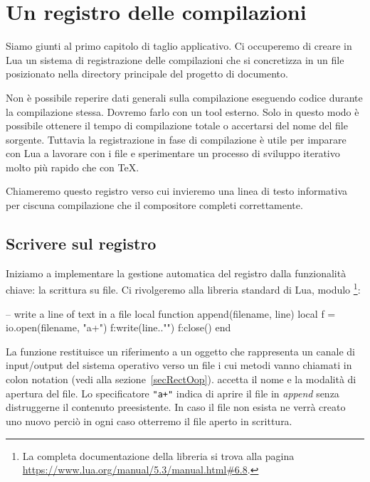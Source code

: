 

\chapter{Un registro delle compilazioni}
\label{iiichRegistro}

Siamo giunti al primo capitolo di taglio applicativo. Ci occuperemo di creare
in Lua un sistema di registrazione delle compilazioni che si concretizza in un
file posizionato nella directory principale del progetto di documento.

Non è possibile reperire dati generali sulla compilazione eseguendo codice
durante la compilazione stessa. Dovremo farlo con un tool esterno. Solo in
questo modo è possibile ottenere il tempo di compilazione totale o accertarsi
del nome del file sorgente. Tuttavia la registrazione in fase di compilazione è
utile per imparare con Lua a lavorare con i file e sperimentare un processo di
sviluppo iterativo molto più rapido che con \TeX.

Chiameremo questo registro  verso cui invieremo una linea di
testo informativa per ciscuna compilazione che il compositore completi
correttamente.


\section{Scrivere sul registro}

Iniziamo a implementare la gestione automatica del registro dalla funzionalità
chiave: la scrittura su file. Ci rivolgeremo alla libreria standard di Lua,
modulo \footnote{La completa documentazione della libreria  si
trova alla pagina \url{https://www.lua.org/manual/5.3/manual.html\#6.8}.}:
\begin{lines}
-- write a line of text in a file
local function append(filename, line)
    local f = io.open(filename, "a+")
    f:write(line.."\n")
    f:close()
end
\end{lines}

La funzione  restituisce un riferimento a un oggetto che rappresenta
un canale di input/output del sistema operativo verso un file i cui metodi vanno
chiamati in colon notation (vedi alla sezione~\ref{secRectOop}). 
accetta il nome e la modalità di apertura del file. Lo specificatore \verb|"a+"|
indica di aprire il file in \emph{append} senza distruggerne il contenuto
preesistente. In caso il file non esista ne verrà creato uno nuovo perciò in
ogni caso otterremo il file aperto in scrittura.

